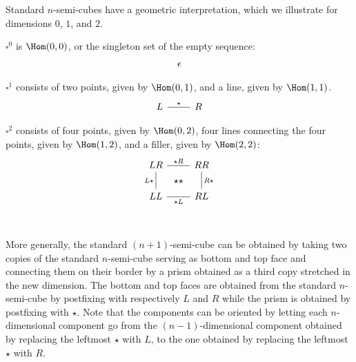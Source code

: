\documentclass{art.cls/art}
\newcommand{\Cube}{\ensuremath{\boldsymbol{{\square}}}}
\newcommand{\kstar}{{\star}}
\begin{document}
Standard $n$-semi-cubes have a geometric interpretation, which we illustrate for dimensions $0$, $1$, and $2$.

\begin{example}[$\Cube^0$]
  $\Cube^0$ is $\Hom(0, 0)$, or the singleton set of the empty sequence:
  \begin{equation*}
    \begin{tikzcd}
      \epsilon
    \end{tikzcd}
  \end{equation*}
\end{example}

\begin{example}[$\Cube^1$]
  $\Cube^1$ consists of two points, given by $\Hom(0, 1)$, and a line, given by $\Hom(1, 1)$.
  \begin{equation*}
    \begin{tikzcd}
      L \arrow[r, "\kstar", dash] & R
    \end{tikzcd}
  \end{equation*}
\end{example}

\begin{example}[$\Cube^2$]
  $\Cube^2$ consists of four points, given by $\Hom(0, 2)$, four lines connecting the four points, given by $\Hom(1, 2)$, and a filler, given by $\Hom(2, 2)$:
  \begin{equation*}
    \begin{tikzcd}
      LR \arrow[r, dash, "\kstar R"{name=F}] \arrow[d, dash, "L\kstar" left] & RR \arrow[d, dash, "R\kstar"] \\
      LL \arrow[r, dash, "\kstar L"{name=T, below}] & RL \\
      \arrow[rightarrow, from=F, to=T, phantom, "\kstar\kstar" description]
    \end{tikzcd}
  \end{equation*}
\end{example}

More generally, the standard $(n + 1)$-semi-cube can be obtained by taking two copies of the standard $n$-semi-cube serving as bottom and top face and connecting them on their border by a prism obtained as a third copy stretched in the new dimension. The bottom and top faces are obtained from the standard $n$-semi-cube by postfixing with respectively $L$ and $R$ while the prism is obtained by postfixing with $\kstar$. Note that the components can be oriented by letting each $n$-dimensional component go from the $(n-1)$-dimensional component obtained by replacing the leftmost $\kstar$ with $L$, to the one obtained by replacing the leftmost $\kstar$ with $R$.
\end{document}

